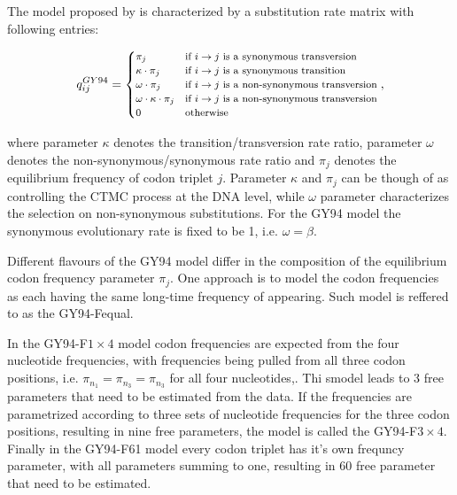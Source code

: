 The model proposed by \cite{Goldman1994} is characterized by a substitution rate matrix with following entries:

\begin{equation}
\footnotesize{
q_{ij}^{GY94}=\begin{cases}
\pi_{j} & \text{if \ensuremath{i\rightarrow j} is a synonymous transversion}\\
\kappa\cdot\pi_{j} & \text{if \ensuremath{i\rightarrow j} is a synonymous transition}\\
\omega\cdot\pi_{j} & \text{if \ensuremath{i\rightarrow j} is a non-synonymous transversion}\\
\omega\cdot\kappa\cdot\pi_{j} & \text{if \ensuremath{i\rightarrow j} is a non-synonymous transversion}\\
0 & \text{otherwise}
\end{cases},
} %
\label{eq:gy94}
\end{equation}

\noindent
where parameter $\kappa$ denotes the transition/transversion rate ratio, parameter $\omega$ denotes the non-synonymous/synonymous
rate ratio and $\pi_j$ denotes the equilibrium frequency of codon triplet $j$.
Parameter $\kappa$ and $\pi_j$ can be though of as controlling the CTMC process at the DNA level, while $\omega$ parameter characterizes the selection on non-synonymous substitutions.
For the GY94 model the synonymous evolutionary rate is fixed to be 1, i.e. $\omega=\beta$.

Different flavours of the GY94 model differ in the composition of the equilibrium codon frequency parameter $\pi_{j}$.
One approach is to model the codon frequencies as each having the same long-time frequency of appearing. 
Such model is reffered to as the GY94-Fequal.

In the GY94-F$1\times4$ model codon frequencies are expected from the four nucleotide frequencies, with frequencies being pulled from all three codon positions, i.e. $\pi_{n_{1}}=\pi_{n_{3}}=\pi_{n_{3}}$ for all four nucleotides,.
Thi smodel leads to 3 free parameters that need to be estimated from the data.
If the frequencies are parametrized according to three sets of nucleotide frequencies for the three codon positions, resulting in nine free parameters, the model is called the GY94-F$3\times4$.
Finally in the GY94-F61 model every codon triplet has it's own frequncy parameter, with all parameters summing to one, resulting in 60 free parameter that need to be estimated.


